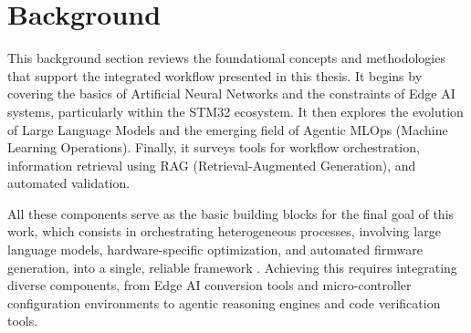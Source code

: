 \chapter{Background}
This background section reviews the foundational concepts and methodologies that support the integrated workflow presented in this thesis. It begins by covering the basics of Artificial Neural Networks and the constraints of Edge AI systems, particularly within the STM32 ecosystem. It then explores the evolution of Large Language Models and the emerging field of Agentic MLOps (Machine Learning Operations). Finally, it surveys tools for workflow orchestration, information retrieval using RAG (Retrieval-Augmented Generation), and automated validation.

All these components serve as the basic building blocks for the final goal of this work, which consists in orchestrating heterogeneous processes, involving large language models, hardware-specific optimization, and automated firmware generation, into a single, reliable framework \cite{su2025daao, hong2024workflowllm}. Achieving this requires integrating diverse components, from Edge AI conversion tools and micro-controller configuration environments to agentic reasoning engines and code verification tools.














